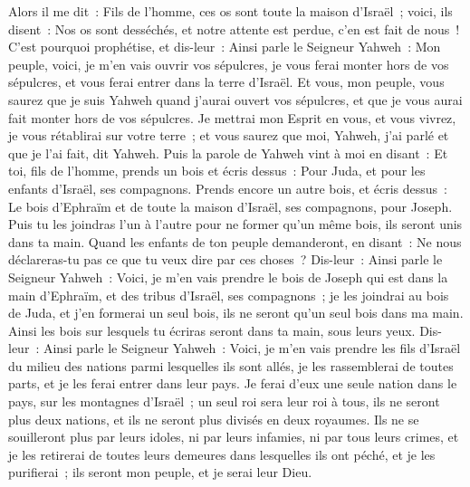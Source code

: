 \begin{multicols}{2}
Alors il me dit~: Fils de l'homme, ces os sont toute la maison d'Israël~; voici, ils disent~: Nos os sont desséchés, et notre attente est perdue, c'en est fait de nous~!
C'est pourquoi prophétise, et dis-leur~: Ainsi parle le Seigneur Yahweh~: Mon peuple, voici, je m'en vais ouvrir vos sépulcres, je vous ferai monter hors de vos sépulcres, et vous ferai entrer dans la terre d'Israël.
Et vous, mon peuple, vous saurez que je suis Yahweh quand j'aurai ouvert vos sépulcres, et que je vous aurai fait monter hors de vos sépulcres.
Je mettrai mon Esprit en vous, et vous vivrez, je vous rétablirai sur votre terre~; et vous saurez que moi, Yahweh, j'ai parlé et que je l'ai fait, dit Yahweh.
Puis la parole de Yahweh vint à moi en disant~:
Et toi, fils de l'homme, prends un bois et écris dessus~: Pour Juda, et pour les enfants d'Israël, ses compagnons. Prends encore un autre bois, et écris dessus~: Le bois d'Ephraïm et de toute la maison d'Israël, ses compagnons, pour Joseph.
Puis tu les joindras l'un à l'autre pour ne former qu'un même bois, ils seront unis dans ta main.
Quand les enfants de ton peuple demanderont, en disant~: Ne nous déclareras-tu pas ce que tu veux dire par ces choses~?
Dis-leur~: Ainsi parle le Seigneur Yahweh~: Voici, je m'en vais prendre le bois de Joseph qui est dans la main d'Ephraïm, et des tribus d'Israël, ses compagnons~; je les joindrai au bois de Juda, et j'en formerai un seul bois, ils ne seront qu'un seul bois dans ma main.
Ainsi les bois sur lesquels tu écriras seront dans ta main, sous leurs yeux.
Dis-leur~: Ainsi parle le Seigneur Yahweh~: Voici, je m'en vais prendre les fils d'Israël du milieu des nations parmi lesquelles ils sont allés, je les rassemblerai de toutes parts, et je les ferai entrer dans leur pays.
Je ferai d'eux une seule nation dans le pays, sur les montagnes d'Israël~; un seul roi sera leur roi à tous, ils ne seront plus deux nations, et ils ne seront plus divisés en deux royaumes.
Ils ne se souilleront plus par leurs idoles, ni par leurs infamies, ni par tous leurs crimes, et je les retirerai de toutes leurs demeures dans lesquelles ils ont péché, et je les purifierai~; ils seront mon peuple, et je serai leur Dieu.

\end{multicols}
